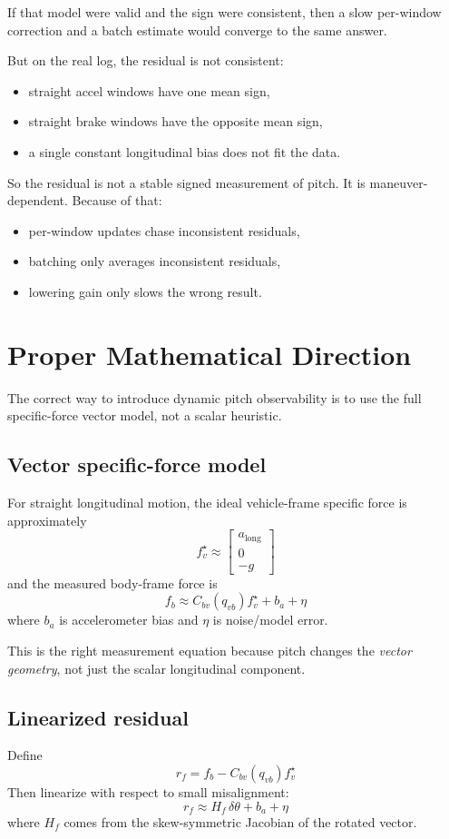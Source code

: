 \documentclass[11pt]{article}
\begin{document}
If that model were valid and the sign were consistent, then a slow per-window correction and a batch estimate would converge to the same answer.

But on the real log, the residual is not consistent:
\begin{itemize}[leftmargin=1.5em]
\item straight accel windows have one mean sign,
\item straight brake windows have the opposite mean sign,
\item a single constant longitudinal bias does not fit the data.
\end{itemize}

So the residual is not a stable signed measurement of pitch. It is maneuver-dependent. Because of that:
\begin{itemize}[leftmargin=1.5em]
\item per-window updates chase inconsistent residuals,
\item batching only averages inconsistent residuals,
\item lowering gain only slows the wrong result.
\end{itemize}

\section{Proper Mathematical Direction}
The correct way to introduce dynamic pitch observability is to use the full specific-force vector model, not a scalar heuristic.

\subsection{Vector specific-force model}
For straight longitudinal motion, the ideal vehicle-frame specific force is approximately
\[
f_v^{\star}
\approx
\begin{bmatrix}
a_{\text{long}} \\
0 \\
-g
\end{bmatrix}
\]
and the measured body-frame force is
\[
f_b
\approx
C_{bv}(q_{vb}) f_v^{\star} + b_a + \eta
\]
where \(b_a\) is accelerometer bias and \(\eta\) is noise/model error.

This is the right measurement equation because pitch changes the \emph{vector geometry}, not just the scalar longitudinal component.

\subsection{Linearized residual}
Define
\[
r_f = f_b - C_{bv}(q_{vb}) f_v^{\star}
\]
Then linearize with respect to small misalignment:
\[
r_f \approx H_f \, \delta\theta + b_a + \eta
\]
where \(H_f\) comes from the skew-symmetric Jacobian of the rotated vector.
\end{document}

